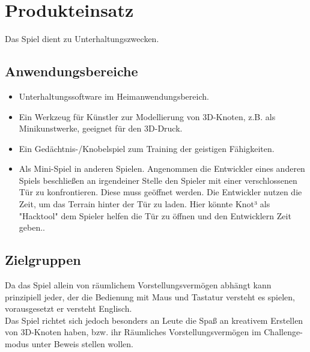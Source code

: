 \chapter{Produkteinsatz}

Das Spiel dient zu Unterhaltungszwecken.

\section{Anwendungsbereiche}


\begin{itemize}

	\item Unterhaltungssoftware im Heimanwendungsbereich. 
	
	\item Ein Werkzeug für Künstler zur Modellierung von 3D-Knoten, z.B. als Minikunstwerke, geeignet für den 3D-Druck.
	
	\item Ein Gedächtnis-/Knobelspiel zum Training der
	geistigen Fähigkeiten.
	
	\item Als Mini-Spiel in anderen Spielen. Angenommen die Entwickler eines anderen Spiels beschließen
	an irgendeiner  Stelle den Spieler mit einer verschlossenen Tür zu konfrontieren. Diese muss
	geöffnet werden. Die Entwickler nutzen die Zeit, um das Terrain hinter der Tür zu laden. Hier könnte
	Knot³ als "Hacktool" dem Spieler helfen die Tür zu öffnen und den Entwicklern Zeit geben..
	
	
\end{itemize}

\section{Zielgruppen}

Da das Spiel allein von räumlichem Vorstellungsvermögen abhängt kann prinzipiell jeder, der die Bedienung mit Maus und Tastatur versteht es spielen, vorausgesetzt er versteht Englisch.
\\
Das Spiel richtet sich jedoch besonders an Leute die Spaß an kreativem Erstellen von 3D-Knoten haben, bzw. ihr Räumliches Vorstellungsvermögen im Challenge-modus unter Beweis stellen wollen.





